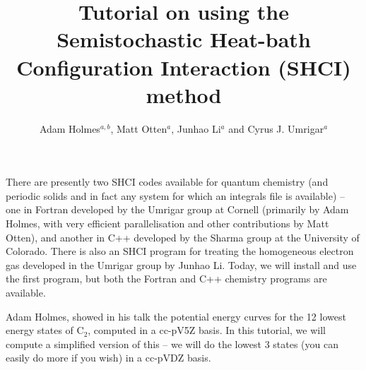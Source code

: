 \documentclass[12pt,aps,prb,groupedaddress,amsmath,amssymb]{revtex4-1}
\begin{document}
\title{Tutorial on using the Semistochastic Heat-bath Configuration Interaction (SHCI) method}

\author{Adam Holmes$^{a,b}$, Matt Otten$^a$, Junhao Li$^a$ and Cyrus J. Umrigar$^a$}

\maketitle

There are presently two SHCI codes available for quantum chemistry (and periodic solids and in fact any system for which an integrals file is available) -- one in Fortran developed by the Umrigar group
at Cornell (primarily by Adam Holmes, with very efficient parallelisation and other contributions by Matt Otten), and another in C++
developed by the Sharma group at the University of Colorado.  There is also an SHCI program for treating the
homogeneous electron gas developed in the Umrigar group by Junhao Li.
Today, we will install and use the first program, but both the Fortran and C++ chemistry programs are available.

Adam Holmes, showed in his talk the potential energy curves for the 12 lowest energy states of C$_2$, computed in a cc-pV5Z basis.
In this tutorial, we will compute a simplified version of this -- we will do the lowest 3 states (you can easily do more if you wish)
in a cc-pVDZ basis.
\end{document}
